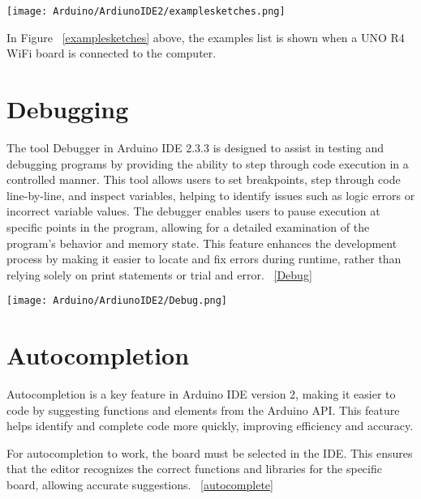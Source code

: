 {\begin{center}
        \texttt{[image: Arduino/ArdiunoIDE2/examplesketches.png]}
        \label{examplesketches}
\end{center}


In Figure  ~\ref{examplesketches} above, the examples list is shown when a UNO R4 WiFi board is connected to the computer.



\section{Debugging}

The tool Debugger in Arduino IDE 2.3.3 is designed to assist in testing and debugging programs by providing the ability to step through code execution in a controlled manner. This tool allows users to set breakpoints, step through code line-by-line, and inspect variables, helping to identify issues such as logic errors or incorrect variable values. The debugger enables users to pause execution at specific points in the program, allowing for a detailed examination of the program's behavior and memory state. This feature enhances the development process by making it easier to locate and fix errors during runtime, rather than relying solely on print statements or trial and error. ~\ref{Debug}


\begin{center}
        \texttt{[image: Arduino/ArdiunoIDE2/Debug.png]}
        \label{Debug}
\end{center}





\section{Autocompletion}

Autocompletion is a key feature in Arduino IDE version 2, making it easier to code by suggesting functions and elements from the Arduino API. This feature helps identify and complete code more quickly, improving efficiency and accuracy.

For autocompletion to work, the board must be selected in the IDE. This ensures that the editor recognizes the correct functions and libraries for the specific board, allowing accurate suggestions. ~\ref{autocomplete}


}
